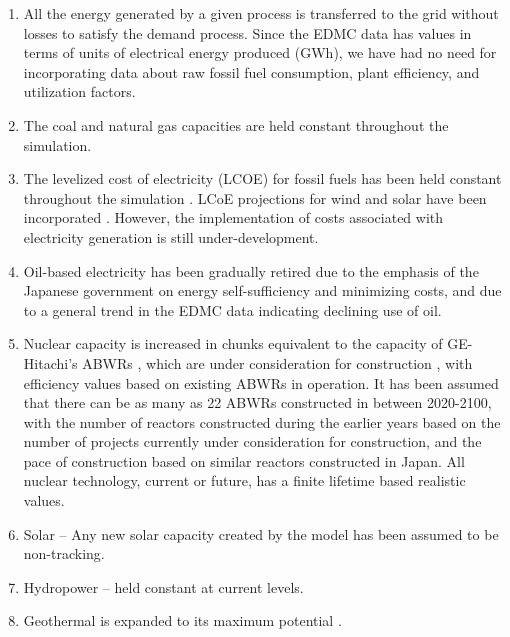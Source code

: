 \documentclass[14pt,a4paper]{article} %
\begin{document}
\begin{enumerate}

\item All the energy generated by a given process is transferred to the grid without losses to satisfy the demand process. Since the EDMC data has values in terms of units of electrical energy produced (GWh), we have had no need for incorporating data about raw fossil fuel consumption, plant efficiency, and utilization factors.

\item The coal and natural gas capacities are held constant throughout the simulation.

\item The levelized cost of electricity (LCOE) for fossil fuels has been held constant throughout the simulation \cite{chapman_energy_2018} \cite{noauthor_lazards_2017} \cite{noauthor_iea_2017}. LCoE projections for wind and solar have been incorporated \cite{noauthor_lazards_2017}. However, the implementation of costs associated with electricity generation is still under-development. 

\item Oil-based electricity has been gradually retired due to the emphasis of the Japanese government on energy self-sufficiency and minimizing costs, and due to a general trend in the EDMC data \cite{noauthor_energy_2018} indicating declining use of oil.

\item Nuclear capacity is increased in chunks equivalent to the capacity of GE-Hitachi's ABWRs \cite{ge_advanced_2007}, which are under consideration for construction \cite{noauthor_electricity_2017}, with efficiency values based on existing ABWRs in operation. It has been assumed that there can be as many as 22 ABWRs constructed in between 2020-2100, with the number of reactors constructed during the earlier years based on the number of projects currently under consideration for construction, and the pace of construction based on similar reactors constructed in Japan. All nuclear technology, current or future, has a finite lifetime based realistic values.

\item Solar – Any new solar capacity created by the model has been assumed to be non-tracking.

\item Hydropower – held constant at current levels.

\item Geothermal is expanded to its maximum potential \cite{noauthor_geothermal_2018}.


\end{enumerate}
\end{document}
